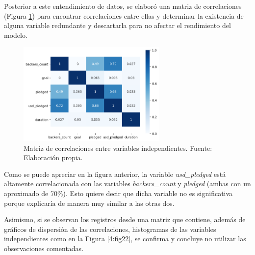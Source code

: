 Posterior a este entendimiento de datos, se elaboró una matriz de correlaciones (Figura \ref{4:fig21}) para encontrar correlaciones entre ellas y determinar la existencia de alguna variable redundante y descartarla para no afectar el rendimiento del modelo.

\begin{figure}[!ht]
	\begin{center}
		\includegraphics[width=0.65\textwidth]{4/figures/metadata correlation.png}
		\caption{Matriz de correlaciones entre variables independientes. Fuente: Elaboración propia.}
		\label{4:fig21}
	\end{center}
\end{figure}

Como se puede apreciar en la figura anterior, la variable \textit{usd\_pledged} está altamente correlacionada con las variables \textit{backers\_count} y \textit{pledged} (ambas con un aproximado de 70\%). Esto quiere decir que dicha variable no es significativa porque explicaría de manera muy similar a las otras dos.

Asimismo, si se observan los registros desde una matriz que contiene, además de gráficos de dispersión de las correlaciones, histogramas de las variables independientes como en la Figura \ref{4:fig22}, se confirma y concluye no utilizar las observaciones comentadas.

